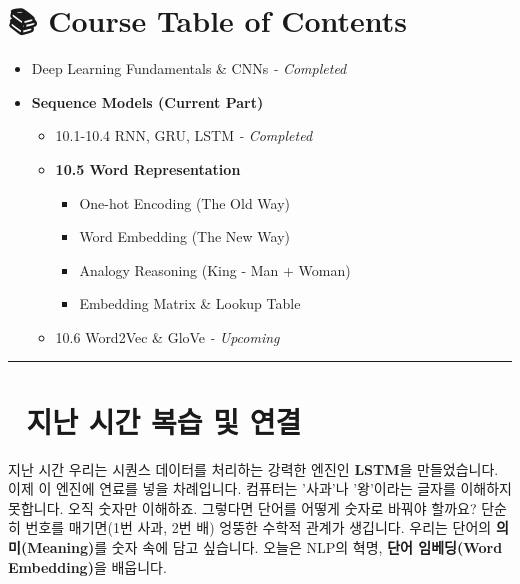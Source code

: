 \documentclass[11pt,a4paper]{book}
\theoremstyle{definition}
\begin{document}
\section*{📚 Course Table of Contents}
\begin{itemize}
    \item[Chapter 1-9.] Deep Learning Fundamentals \& CNNs \textit{- Completed}
    \item[\textbf{Chapter 10.}] \textbf{Sequence Models (Current Part)}
    \begin{itemize}
        \item 10.1-10.4 RNN, GRU, LSTM \textit{- Completed}
        \item \textbf{10.5 Word Representation}
        \begin{itemize}
            \item One-hot Encoding (The Old Way)
            \item Word Embedding (The New Way)
            \item Analogy Reasoning (King - Man + Woman)
            \item Embedding Matrix \& Lookup Table
        \end{itemize}
        \item 10.6 Word2Vec \& GloVe \textit{- Upcoming}
    \end{itemize}
\end{itemize}

\vspace{0.5cm}
\hrule
\vspace{0.5cm}

\section*{🔗 지난 시간 복습 및 연결}
지난 시간 우리는 시퀀스 데이터를 처리하는 강력한 엔진인 \textbf{LSTM}을 만들었습니다. 이제 이 엔진에 연료를 넣을 차례입니다.
컴퓨터는 '사과'나 '왕'이라는 글자를 이해하지 못합니다. 오직 숫자만 이해하죠. 그렇다면 단어를 어떻게 숫자로 바꿔야 할까요?
단순히 번호를 매기면(1번 사과, 2번 배) 엉뚱한 수학적 관계가 생깁니다. 우리는 단어의 \textbf{의미(Meaning)}를 숫자 속에 담고 싶습니다. 오늘은 NLP의 혁명, \textbf{단어 임베딩(Word Embedding)}을 배웁니다.

\end{document}
